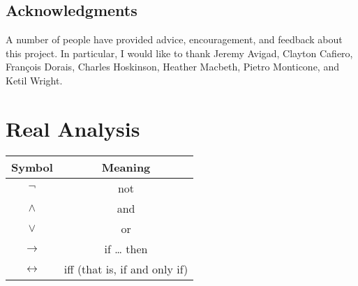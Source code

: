 \documentclass[
  letterpaper,
  DIV=11,
  numbers=noendperiod]{scrreprt}
\theoremstyle{remark}
\begin{document}
\hypertarget{acknowledgments}{%
\section*{Acknowledgments}\label{acknowledgments}}


A number of people have provided advice, encouragement, and feedback
about this project. In particular, I would like to thank Jeremy Avigad,
Clayton Cafiero, François Dorais, Charles Hoskinson, Heather Macbeth,
Pietro Monticone, and Ketil Wright.


\hypertarget{real-analysis}{%
\chapter{Real Analysis}\label{real-analysis}}

\begin{longtable}[]{@{}cc@{}}
\toprule\noalign{}
Symbol & Meaning \\
\midrule\noalign{}
\endhead
\bottomrule\noalign{}
\endlastfoot
\(\neg\) & not \\
\(\wedge\) & and \\
\(\vee\) & or \\
\(\to\) & if \ldots{} then \\
\(\leftrightarrow\) & iff (that is, if and only if) \\
\end{longtable}
\end{document}
